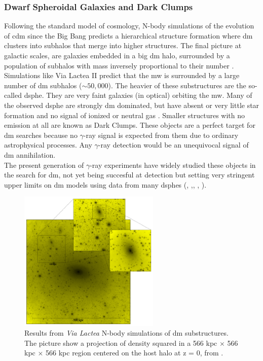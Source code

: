\documentclass[main.tex]{subfiles}
\begin{document}
\subsubsection{Dwarf Spheroidal Galaxies and Dark Clumps}

Following the standard model of cosmology, N-body simulations of the evolution of \gls{cdm} since the Big Bang predicts a hierarchical structure formation where \gls{dm} clusters into subhalos that merge into higher structures. The final picture at galactic scales, are galaxies embedded in a big \gls{dm} halo, surrounded by a population of subhalos with mass inversely proportional to their number \cite{2008DMhalossubhalosDSphe}. Simulations like Via Lactea II predict that the \gls{mw} is surrounded by a large number of \gls{dm} subhalos ($\sim 50,000$). The heavier of these substructures are the so-called \gls{dsphe}. They are very faint galaxies (in optical) orbiting the \gls{mw}. Many of the observed \gls{dsphe} are strongly \gls{dm} dominated, but have absent or very little star formation and no signal of ionized or neutral gas \cite{2007Dwarfs}. Smaller structures with no emission at all are known as Dark Clumps.
These objects are a perfect target for \gls{dm} searches because no $\gamma$-ray signal is expected from them due to ordinary astrophysical processes. Any $\gamma$-ray detection would be an unequivocal signal of \gls{dm} annihilation. \\
The present generation of $\gamma$-ray experiments have widely studied these objects in the search for \gls{dm}, not yet being succesful at detection but setting very stringent upper limits on \gls{dm} models using data from many \glspl{dsphe} (\cite{2010DSpheFermi}, \cite{2014DSpheHESS},\cite{2018DSpheMAGIC}, \cite{2017DSpheVERITAS}, \cite{2019DSpheCombined}).
\begin{figure}[h]
\centering
 \includegraphics[width=0.6\textwidth]{Pictures/DMsubhalos.pdf}
  \caption{Results from \textit{Via Lactea} N-body simulations of \gls{dm} substructures. The picture show a projection of density squared in a 566 kpc $\times$ 566 kpc $\times$ 566 kpc region centered on the host halo at z = 0, from \cite{2008DMhalossubhalosDSphe}.}
    \label{fig:DMstructhalos}
\end{figure}
\end{document}
